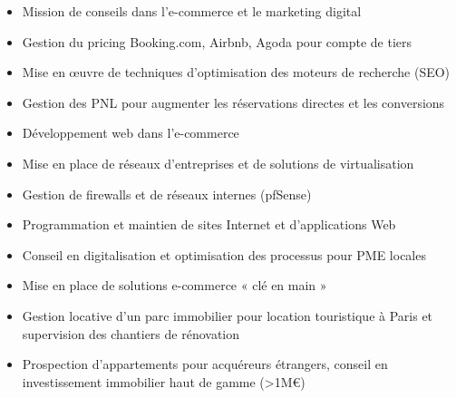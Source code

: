 \documentclass[10pt,a4paper,ragged2e,withhyper]{altacv}
\begin{document}
\begin{paracol}{2}
\divider

\begin{itemize}
\item Mission de conseils dans l'e-commerce et le marketing digital
\item Gestion du pricing Booking.com, Airbnb, Agoda pour compte de tiers
\item Mise en œuvre de techniques d'optimisation des moteurs de recherche (SEO)
\item Gestion des PNL pour augmenter les réservations directes et les conversions
\end{itemize}

\divider

\begin{itemize}
\item Développement web dans l'e-commerce
\item Mise en place de réseaux d'entreprises et de solutions de virtualisation
\item Gestion de firewalls et de réseaux internes (pfSense)
\end{itemize}

\divider

\begin{itemize}
\item Programmation et maintien de sites Internet et d'applications Web
\item Conseil en digitalisation et optimisation des processus pour PME locales
\item Mise en place de solutions e-commerce « clé en main »
\end{itemize}

\divider

\begin{itemize}
\item Gestion locative d'un parc immobilier pour location touristique à Paris et supervision des chantiers de rénovation
\item Prospection d'appartements pour acquéreurs étrangers, conseil en investissement immobilier haut de gamme (>1M€)
\end{itemize}


\end{paracol}
\end{document}
